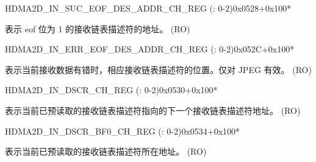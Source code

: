 \begin{register}{H}{DMA2D\_IN\_SUC\_EOF\_DES\_ADDR\_CH\_REG (: 0-2)}{0x0528+0x100*}\label{regdesc:DMA2DINSUCEOFDESADDRCHNREG}
%
\regnewline%
\begin{regdesc}\begin{reglist}
\label{fielddesc:DMA2DINSUCEOFDESADDRCHN}\item [DMA2D\_IN\_SUC\_EOF\_DES\_ADDR\_CH\regindex{n}] 表示 eof 位为 1 的接收链表描述符的地址。 (RO)
\end{reglist}\end{regdesc}
\end{register}


\begin{register}{H}{DMA2D\_IN\_ERR\_EOF\_DES\_ADDR\_CH\_REG (: 0-2)}{0x052C+0x100*}\label{regdesc:DMA2DINERREOFDESADDRCHNREG}
%
\regnewline%
\begin{regdesc}\begin{reglist}
\label{fielddesc:DMA2DINERREOFDESADDRCHN}\item [DMA2D\_IN\_ERR\_EOF\_DES\_ADDR\_CH\regindex{n}] 表示当前接收数据有错时，相应接收链表描述符的位置。仅对 JPEG 有效。 (RO)
\end{reglist}\end{regdesc}
\end{register}


\begin{register}{H}{DMA2D\_IN\_DSCR\_CH\_REG (: 0-2)}{0x0530+0x100*}\label{regdesc:DMA2DINDSCRCHNREG}
%
\regnewline%
\begin{regdesc}\begin{reglist}
\label{fielddesc:DMA2DINLINKDSCRCHN}\item [DMA2D\_INLINK\_DSCR\_CH\regindex{n}] 表示当前已预读取的接收链表描述符指向的下一个接收链表描述符地址。 (RO)
\end{reglist}\end{regdesc}
\end{register}


\begin{register}{H}{DMA2D\_IN\_DSCR\_BF0\_CH\_REG (: 0-2)}{0x0534+0x100*}\label{regdesc:DMA2DINDSCRBF0CHNREG}
%
\regnewline%
\begin{regdesc}\begin{reglist}
\label{fielddesc:DMA2DINLINKDSCRBF0CHN}\item [DMA2D\_INLINK\_DSCR\_BF0\_CH\regindex{n}] 表示当前已预读取的接收链表描述符所在地址。 (RO)
\end{reglist}\end{regdesc}
\end{register}


